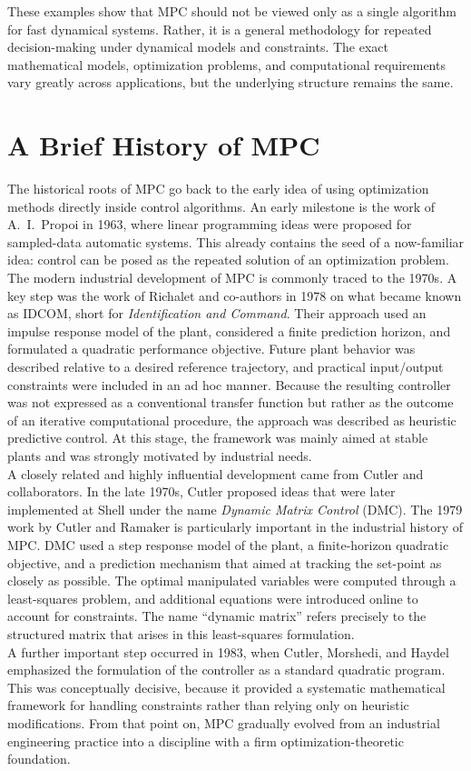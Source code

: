 These examples show that MPC should not be viewed only as a single algorithm for fast dynamical systems. Rather, it is a general methodology for repeated decision-making under dynamical models and constraints. The exact mathematical models, optimization problems, and computational requirements vary greatly across applications, but the underlying structure remains the same.

\section{A Brief History of MPC}

The historical roots of MPC go back to the early idea of using optimization methods directly inside control algorithms. An early milestone is the work of A.~I.~Propoi in 1963, where linear programming ideas were proposed for sampled-data automatic systems. This already contains the seed of a now-familiar idea: control can be posed as the repeated solution of an optimization problem.\\
The modern industrial development of MPC is commonly traced to the 1970s. A key step was the work of Richalet and co-authors in 1978 on what became known as IDCOM, short for \emph{Identification and Command}. Their approach used an impulse response model of the plant, considered a finite prediction horizon, and formulated a quadratic performance objective. Future plant behavior was described relative to a desired reference trajectory, and practical input/output constraints were included in an ad hoc manner. Because the resulting controller was not expressed as a conventional transfer function but rather as the outcome of an iterative computational procedure, the approach was described as heuristic predictive control. At this stage, the framework was mainly aimed at stable plants and was strongly motivated by industrial needs.\\

A closely related and highly influential development came from Cutler and collaborators. In the late 1970s, Cutler proposed ideas that were later implemented at Shell under the name \emph{Dynamic Matrix Control} (DMC). The 1979 work by Cutler and Ramaker is particularly important in the industrial history of MPC. DMC used a step response model of the plant, a finite-horizon quadratic objective, and a prediction mechanism that aimed at tracking the set-point as closely as possible. The optimal manipulated variables were computed through a least-squares problem, and additional equations were introduced online to account for constraints. The name ``dynamic matrix'' refers precisely to the structured matrix that arises in this least-squares formulation.\\
A further important step occurred in 1983, when Cutler, Morshedi, and Haydel emphasized the formulation of the controller as a standard quadratic program. This was conceptually decisive, because it provided a systematic mathematical framework for handling constraints rather than relying only on heuristic modifications. From that point on, MPC gradually evolved from an industrial engineering practice into a discipline with a firm optimization-theoretic foundation.\\

